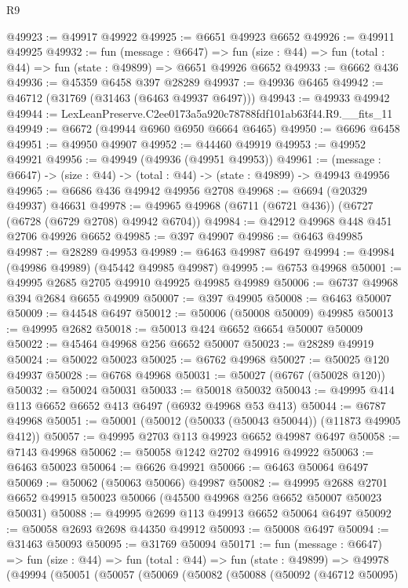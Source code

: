 \begin{lexlean}{R9}
\begin{coremodule}
@49923 := @49917 @49922
@49925 := @6651 @49923 @6652
@49926 := @49911 @49925
@49932 := fun (message : @6647) =>
  fun (size : @44) => fun (total : @44) => fun (state : @49899) => @6651 @49926 @6652
@49933 := @6662 @436
@49936 := @45359 @6458 @397 @28289
@49937 := @49936 @6465
@49942 := @46712 (@31769 (@31463 (@6463 @49937 @6497)))
@49943 := @49933 @49942
@49944 := LexLeanPreserve.C2ee0173a5a920c78788fdf101ab63f44.R9.__fits_11
@49949 := @6672 (@49944 @6960 @6950 @6664 @6465)
@49950 := @6696 @6458
@49951 := @49950 @49907
@49952 := @44460 @49919
@49953 := @49952 @49921
@49956 := @49949 (@49936 (@49951 @49953))
@49961 := (message : @6647) -> (size : @44) -> (total : @44) -> (state : @49899) -> @49943 @49956
@49965 := @6686 @436 @49942 @49956 @2708
@49968 := @6694 (@20329 @49937) @46631
@49978 := @49965 @49968 (@6711 (@6721 @436)) (@6727 (@6728 (@6729 @2708) @49942 @6704))
@49984 := @42912 @49968 @448 @451 @2706 @49926 @6652
@49985 := @397 @49907
@49986 := @6463 @49985
@49987 := @28289 @49953
@49989 := @6463 @49987 @6497
@49994 := @49984 (@49986 @49989) (@45442 @49985 @49987)
@49995 := @6753 @49968
@50001 := @49995 @2685 @2705 @49910 @49925 @49985 @49989
@50006 := @6737 @49968 @394 @2684 @6655 @49909
@50007 := @397 @49905
@50008 := @6463 @50007
@50009 := @44548 @6497
@50012 := @50006 (@50008 @50009) @49985
@50013 := @49995 @2682
@50018 := @50013 @424 @6652 @6654 @50007 @50009
@50022 := @45464 @49968 @256 @6652 @50007
@50023 := @28289 @49919
@50024 := @50022 @50023
@50025 := @6762 @49968
@50027 := @50025 @120 @49937
@50028 := @6768 @49968
@50031 := @50027 (@6767 (@50028 @120))
@50032 := @50024 @50031
@50033 := @50018 @50032
@50043 := @49995 @414 @113 @6652 @6652 @413 @6497 (@6932 @49968 @53 @413)
@50044 := @6787 @49968
@50051 := @50001 (@50012 (@50033 (@50043 @50044)) (@11873 @49905 @412))
@50057 := @49995 @2703 @113 @49923 @6652 @49987 @6497
@50058 := @7143 @49968
@50062 := @50058 @1242 @2702 @49916 @49922
@50063 := @6463 @50023
@50064 := @6626 @49921
@50066 := @6463 @50064 @6497
@50069 := @50062 (@50063 @50066) @49987
@50082 := @49995
    @2688
    @2701
    @6652
    @49915
    @50023
    @50066
    (@45500 @49968 @256 @6652 @50007 @50023 @50031)
@50088 := @49995 @2699 @113 @49913 @6652 @50064 @6497
@50092 := @50058 @2693 @2698 @44350 @49912
@50093 := @50008 @6497
@50094 := @31463 @50093
@50095 := @31769 @50094
@50171 := fun (message : @6647) =>
  fun (size : @44) =>
  fun (total : @44) =>
  fun (state : @49899) =>
  @49978
    (@49994
      (@50051
        (@50057
          (@50069
            (@50082
              (@50088
                (@50092
                  (@46712 @50095)

\end{coremodule}
\end{lexlean}

